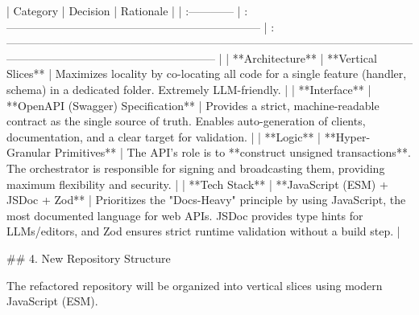 | Category      | Decision                                                              | Rationale                                                                                                                                                             |
| :------------ | :-------------------------------------------------------------------- | :-------------------------------------------------------------------------------------------------------------------------------------------------------------------- |
| **Architecture**  | **Vertical Slices**                                                   | Maximizes locality by co-locating all code for a single feature (handler, schema) in a dedicated folder. Extremely LLM-friendly.                                     |
| **Interface**     | **OpenAPI (Swagger) Specification**                                   | Provides a strict, machine-readable contract as the single source of truth. Enables auto-generation of clients, documentation, and a clear target for validation.        |
| **Logic**         | **Hyper-Granular Primitives**                                         | The API's role is to **construct unsigned transactions**. The orchestrator is responsible for signing and broadcasting them, providing maximum flexibility and security. |
| **Tech Stack**    | **JavaScript (ESM) + JSDoc + Zod**                                    | Prioritizes the "Docs-Heavy" principle by using JavaScript, the most documented language for web APIs. JSDoc provides type hints for LLMs/editors, and Zod ensures strict runtime validation without a build step. |

## 4. New Repository Structure

The refactored repository will be organized into vertical slices using modern JavaScript (ESM).

